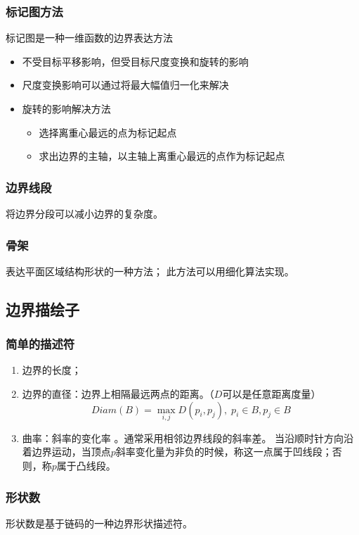 \subsubsection{标记图方法}
标记图是一种一维函数的边界表达方法
\begin{itemize}
\item 不受目标平移影响，但受目标尺度变换和旋转的影响
\item 尺度变换影响可以通过将最大幅值归一化来解决
\item 旋转的影响解决方法
\begin{itemize}
	\item 选择离重心最远的点为标记起点
	\item 求出边界的主轴，以主轴上离重心最远的点作为标记起点
\end{itemize}
\end{itemize}

\subsubsection{边界线段}
将边界分段可以减小边界的复杂度。

\subsubsection{骨架}
表达平面区域结构形状的一种方法；
此方法可以用细化算法实现。

\subsection{边界描绘子}
\subsubsection{简单的描述符}
\begin{enumerate}
\item 边界的长度；
\item 边界的直径：边界上相隔最远两点的距离。（$D$可以是任意距离度量）
\[Diam(B)=\max_{i,j}D(p_i,p_j),\;p_i\in B,p_j\in B\]
\item 曲率：斜率的变化率 。通常采用相邻边界线段的斜率差。
当沿顺时针方向沿着边界运动，当顶点$p$斜率变化量为非负的时候，称这一点属于凹线段；否则，称$p$属于凸线段。
\end{enumerate}

\subsubsection{形状数}
形状数是基于链码的一种边界形状描述符。

